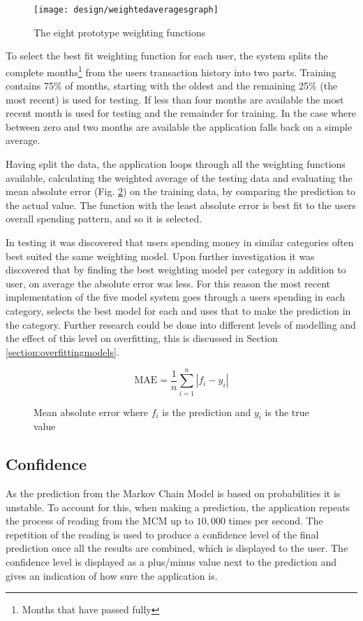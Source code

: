 \begin{figure}[h]
    \centering
    \texttt{[image: design/weightedaveragesgraph]}
    \caption{The eight prototype weighting functions}
    \label{fig:weightedaveragegraph}
\end{figure}

To select the best fit weighting function for each user, the system splits the complete months\footnote{Months that have passed fully} from the users transaction history into two parts. Training contains 75\% of months, starting with the oldest and the remaining 25\% (the most recent) is used for testing.
%
If less than four months are available the most recent month is used for testing and the remainder for training. In the case where between zero and two months are available the application falls back on a simple average.

Having split the data, the application loops through all the weighting functions available, calculating the weighted average of the testing data and evaluating the mean absolute error (Fig. \ref{fig:absoluteerror}) on the training data, by comparing the prediction to the actual value. The function with the least absolute error is best fit to the users overall spending pattern, and so it is selected.

In testing it was discovered that users spending money in similar categories often best suited the same weighting model. Upon further investigation it was discovered that by finding the best weighting model per category in addition to user, on average the absolute error was less. For this reason the most recent implementation of the five model system goes through a users spending in each category, selects the best model for each and uses that to make the prediction in the category. Further research could be done into different levels of modelling and the effect of this level on overfitting, this is discussed in Section \ref{section:overfittingmodels}.

\begin{figure}[h]
    \centering
    \[
        \mathrm{MAE} = \frac{1}{n}\sum_{i=1}^n \left| f_i-y_i\right| 
    \]
    \caption[Mean absolute error formula]{Mean absolute error where $f_i$ is the prediction and $y_i$ is the true value}
    \label{fig:absoluteerror}
\end{figure}

 

\subsection{Confidence}
As the prediction from the Markov Chain Model is based on probabilities it is unstable. To account for this, when making a prediction, the application repeats the process of reading from the MCM up to $10,000$ times per second. The repetition of the reading is used to produce a confidence level of the final prediction once all the results are combined, which is displayed to the user. The confidence level is displayed as a plus/minus value next to the prediction and gives an indication of how sure the application is. 

